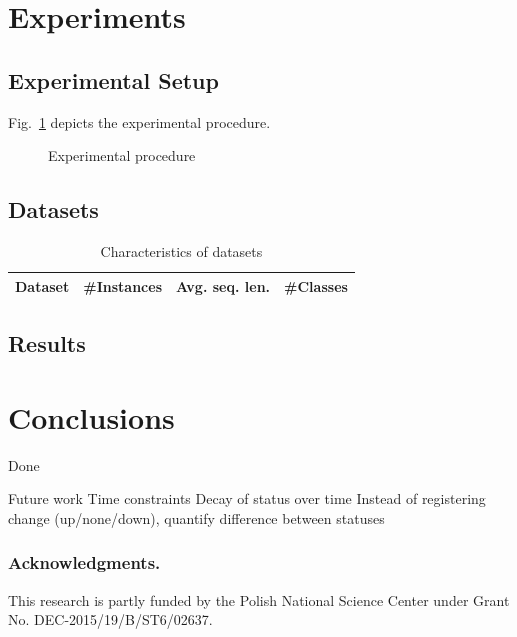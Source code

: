 \documentclass[runningheads,a4paper]{llncs}
\begin{document}
\section{Experiments}
\label{sec:experiments}
\subsection{Experimental Setup}

Fig.~\ref{fig:setup} depicts the experimental procedure.
\begin{figure}[h]
	\centering
	\caption{Experimental procedure}
	\label{fig:setup}
\end{figure}

\subsection{Datasets}

\begin{table}[htbp]
	\scriptsize
  \centering
  \caption{Characteristics of datasets}
    \begin{tabularx}{\textwidth}{l@{}R@{}R@{}R@{}}
		\toprule
    Dataset  & \#Instances & Avg. seq. len. & \#Classes \\
		\midrule

    \bottomrule
    \end{tabularx}%
  \label{tab:datasets}%
\end{table}%

\subsection{Results}

\section{Conclusions}
\label{sec:conclusions}
Done

Future work
Time constraints
Decay of status over time
Instead of registering change (up/none/down), quantify difference between statuses

\subsubsection*{Acknowledgments.} This research is partly funded by the Polish National Science Center under Grant No. DEC-2015/19/B/ST6/02637.



\end{document}
